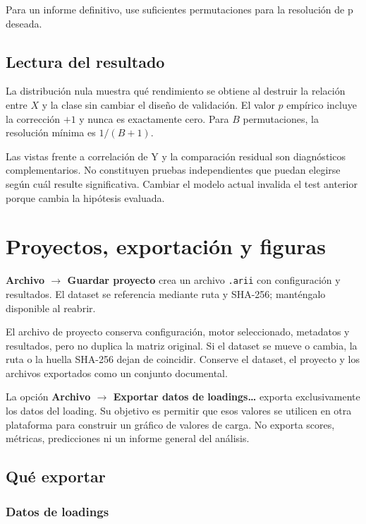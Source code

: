 \documentclass[11pt,a4paper,openany]{report}
\newcommand{\menu}[1]{\textbf{#1}}
\newcommand{\code}[1]{\texttt{#1}}
\begin{document}
Para un informe definitivo, use suficientes permutaciones para la resolución de
p deseada.

\section{Lectura del resultado}

La distribución nula muestra qué rendimiento se obtiene al destruir la relación
entre $X$ y la clase sin cambiar el diseño de validación. El valor $p$ empírico
incluye la corrección $+1$ y nunca es exactamente cero. Para $B$ permutaciones,
la resolución mínima es $1/(B+1)$.

Las vistas frente a correlación de Y y la comparación residual son diagnósticos
complementarios. No constituyen pruebas independientes que puedan elegirse
según cuál resulte significativa. Cambiar el modelo actual invalida el test
anterior porque cambia la hipótesis evaluada.

\chapter{Proyectos, exportación y figuras}

\menu{Archivo \texorpdfstring{$\rightarrow$}{ > } Guardar proyecto} crea un
archivo \code{.arii} con configuración y resultados. El dataset se referencia mediante ruta y SHA-256; manténgalo disponible al reabrir.

El archivo de proyecto conserva configuración, motor seleccionado, metadatos y resultados, pero no
duplica la matriz original. Si el dataset se mueve o cambia, la ruta o la huella
SHA-256 dejan de coincidir. Conserve el dataset, el proyecto y los archivos
exportados como un conjunto documental.

La opción \menu{Archivo \texorpdfstring{$\rightarrow$}{ > } Exportar datos de
loadings…} exporta exclusivamente los datos del loading. Su objetivo es permitir
que esos valores se utilicen en otra plataforma para construir un gráfico de
valores de carga. No exporta scores, métricas, predicciones ni un informe general
del análisis.

\section{Qué exportar}

\subsection{Datos de loadings}
\end{document}
